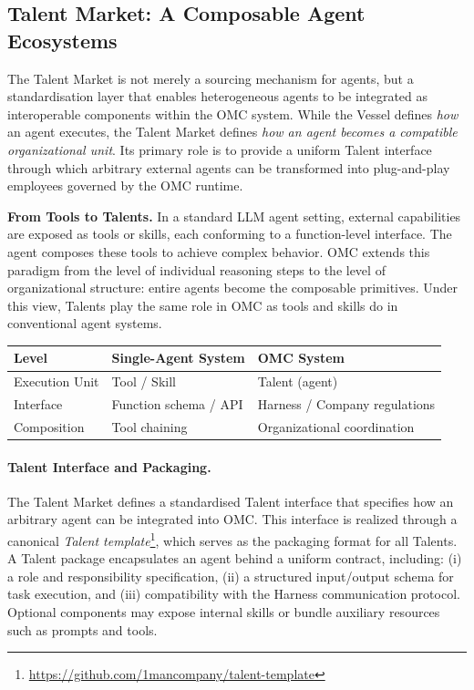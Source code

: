 \subsection{Talent Market: A Composable Agent Ecosystems}
\label{sec:talent-market}

The Talent Market is not merely a sourcing mechanism for agents, but a standardisation layer that enables heterogeneous agents to be integrated as interoperable components within the OMC system. While the Vessel defines \emph{how} an agent executes, the Talent Market defines \emph{how an agent becomes a compatible organizational unit}. Its primary role is to provide a uniform Talent interface through which arbitrary external agents can be transformed into plug-and-play employees governed by the OMC runtime.

\textbf{From Tools to Talents.}
In a standard LLM agent setting, external capabilities are exposed as tools or skills, each conforming to a function-level interface. The agent composes these tools to achieve complex behavior. OMC extends this paradigm from the level of individual reasoning steps to the level of organizational structure: entire agents become the composable primitives. Under this view, Talents play the same role in OMC as tools and skills do in conventional agent systems.

\begin{center}
\begin{tabular}{l|l|l}
\toprule
\textbf{Level} & \textbf{Single-Agent System} & \textbf{OMC System} \\
\midrule
Execution Unit & Tool / Skill & Talent (agent) \\
Interface & Function schema / API & Harness / Company regulations \\
Composition & Tool chaining & Organizational coordination \\
\bottomrule
\end{tabular}
\end{center}


\paragraph{Talent Interface and Packaging.}
The Talent Market defines a standardised Talent interface that specifies how an arbitrary agent can be integrated into OMC. This interface is realized through a canonical \emph{Talent template}\footnote{\url{https://github.com/1mancompany/talent-template}}, which serves as the packaging format for all Talents. A Talent package encapsulates an agent behind a uniform contract, including: (i) a role and responsibility specification, (ii) a structured input/output schema for task execution, and (iii) compatibility with the Harness communication protocol. Optional components may expose internal skills or bundle auxiliary resources such as prompts and tools.

